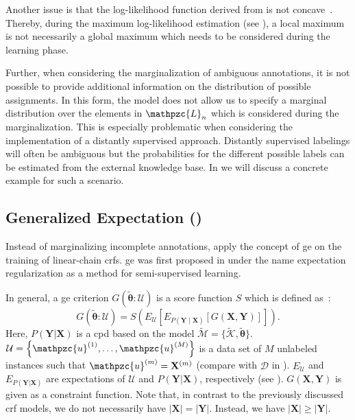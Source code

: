 Another issue is that the log-likelihood function derived from  is not concave~\citep{tsuboi2008training}.
Thereby, during the maximum log-likelihood estimation (see ), a local maximum is not necessarily a global maximum which needs to be considered during the learning phase.

Further, when considering the marginalization of ambiguous annotations, it is not possible to provide additional information on the distribution of possible assignments.
In this form, the model does not allow us to specify a \gls{marginal distribution} over the elements in $\mathpzc{L}_n$ which is considered during the marginalization.
This is especially problematic when considering the implementation of a distantly supervised approach.
Distantly supervised labelings will often be ambiguous but the probabilities for the different possible labels can be estimated from the external knowledge base.
In  we will discuss a concrete example for such a scenario.

\subsection{Generalized Expectation ()}

Instead of marginalizing incomplete annotations, \citet{mann2008generalized} apply the concept of \acrfull{ge} on the training of linear-chain \glspl{crf}.
\Gls{ge} was first proposed in \citet{mann2007simple} under the name \gls{expectation regularization} as a method for semi-supervised learning.

In general, a \gls{ge} criterion $G(\bm{\tilde{\theta}}:\mathcal{U})$ is a score function $S$ which is defined as~\citep{mann2010generalized}:
\begin{equation}
  \label{equ:generalized-expectation}
  G(\bm{\tilde{\theta}}:\mathcal{U})=S\left(E_{\mathcal{U}}\left[E_{P(\mathbf{Y}\mid\mathbf{X})}\left[G(\mathbf{X},\mathbf{Y})\right]\right]\right).
\end{equation}
Here, $P(\mathbf{Y}|\mathbf{X})$ is a \gls{cpd} based on the model $\tilde{\mathcal{M}}=\{\tilde{\mathcal{K}},\bm{\tilde{\theta}}\}$.
$\mathcal{U}=\left\{\mathpzc{u}^{(1)},\dots,\mathpzc{u}^{(M)}\right\}$ is a data set of $M$ unlabeled instances such that $\mathpzc{u}^{(m)}=\mathbf{X}^{(m)}$ (compare with $\mathcal{D}$ in ).
$E_{\mathcal{U}}$ and $E_{P(\mathbf{Y}|\mathbf{X})}$ are expectations of $\mathcal{U}$ and $P(\mathbf{Y}|\mathbf{X})$, respectively (see ).
$G(\mathbf{X},\mathbf{Y})$ is given as a constraint function.
Note that, in contrast to the previously discussed \gls{crf} models, we do not necessarily have $|\mathbf{X}|=|\mathbf{Y}|$.
Instead, we have $|\mathbf{X}|\geq|\mathbf{Y}|$.

